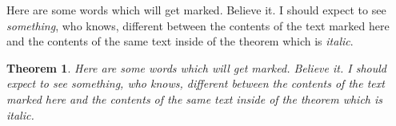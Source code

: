 \documentclass{amsart}
\newtheorem{thm}{Theorem}
\begin{document}
Here are some words which will get marked. Believe it. I should expect to see \textit{something}, who knows, different between the contents of the text
marked here and the contents of the same text inside of the theorem which is \textit{italic}.

\begin{thm}
  Here are some words which will get marked. Believe it. I should expect to see \textit{something}, who knows, different between the contents of the text
marked here and the contents of the same text inside of the theorem which is \textit{italic}.
\end{thm}
\end{document}
